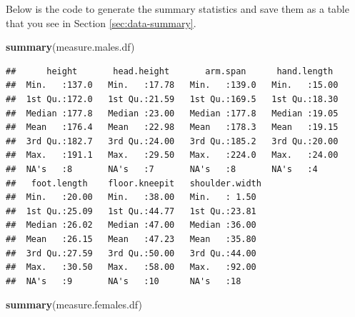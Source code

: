 \documentclass[]{article}
\newenvironment{Shaded}{\begin{snugshade}}{\end{snugshade}}
\newcommand{\KeywordTok}[1]{\textcolor[rgb]{0.13,0.29,0.53}{\textbf{#1}}}
\newcommand{\NormalTok}[1]{#1}
\newcommand{\OperatorTok}[1]{\textcolor[rgb]{0.81,0.36,0.00}{\textbf{#1}}}
\newcommand{\StringTok}[1]{\textcolor[rgb]{0.31,0.60,0.02}{#1}}
\begin{document}
\begin{Shaded}
\end{Shaded}

Below is the code to generate the summary statistics and save them as a
table that you see in Section \ref{sec:data-summary}.

\begin{Shaded}
\begin{Highlighting}[]
\KeywordTok{summary}\NormalTok{(measure.males.df)}
\end{Highlighting}
\end{Shaded}

\begin{verbatim}
##      height       head.height       arm.span      hand.length   
##  Min.   :137.0   Min.   :17.78   Min.   :139.0   Min.   :15.00  
##  1st Qu.:172.0   1st Qu.:21.59   1st Qu.:169.5   1st Qu.:18.30  
##  Median :177.8   Median :23.00   Median :177.8   Median :19.05  
##  Mean   :176.4   Mean   :22.98   Mean   :178.3   Mean   :19.15  
##  3rd Qu.:182.7   3rd Qu.:24.00   3rd Qu.:185.2   3rd Qu.:20.00  
##  Max.   :191.1   Max.   :29.50   Max.   :224.0   Max.   :24.00  
##  NA's   :8       NA's   :7       NA's   :8       NA's   :4      
##   foot.length    floor.kneepit   shoulder.width 
##  Min.   :20.00   Min.   :38.00   Min.   : 1.50  
##  1st Qu.:25.09   1st Qu.:44.77   1st Qu.:23.81  
##  Median :26.02   Median :47.00   Median :36.00  
##  Mean   :26.15   Mean   :47.23   Mean   :35.80  
##  3rd Qu.:27.59   3rd Qu.:50.00   3rd Qu.:44.00  
##  Max.   :30.50   Max.   :58.00   Max.   :92.00  
##  NA's   :9       NA's   :10      NA's   :18
\end{verbatim}

\begin{Shaded}
\begin{Highlighting}[]
\KeywordTok{summary}\NormalTok{(measure.females.df)}
\end{Highlighting}
\end{Shaded}
\end{document}
